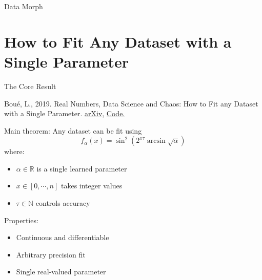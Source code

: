 \documentclass[10pt]{beamer}
\begin{document}
\begin{frame}{Data Morph}
  \begin{center}
  \end{center}
\end{frame}

\section{How to Fit Any Dataset with a Single Parameter}

\begin{frame}{The Core Result}

Boué, L., 2019. Real Numbers, Data Science and Chaos: How to Fit any Dataset with a Single Parameter. \href{https://arxiv.org/abs/1904.12320}{arXiv}, \href{https://github.com/Ranlot/single-parameter-fit}{Code.}
\vspace{5mm}

Main theorem: Any dataset can be fit using
\[ f_\alpha(x) = \sin^2(2^{x\tau} \arcsin\sqrt{\alpha}) \]
where:
\begin{itemize}
\item $\alpha \in \mathbb{R}$ is a single learned parameter
\item $x \in [0,\cdots,n]$ takes integer values
\item $\tau \in \mathbb{N}$ controls accuracy
\end{itemize}

Properties:
\begin{itemize}
\item Continuous and differentiable
\item Arbitrary precision fit
\item Single real-valued parameter
\end{itemize}
\end{frame}
\end{document}
